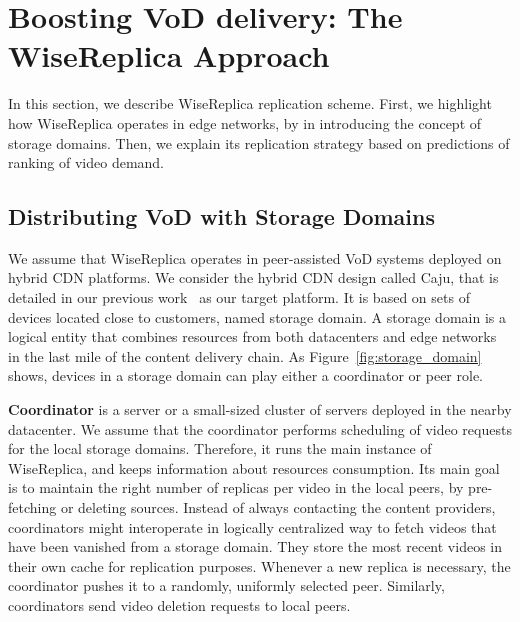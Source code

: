 \section{Boosting VoD delivery: The WiseReplica Approach}
\label{sec:replication_scheme}

In this section, we describe WiseReplica replication scheme. First, we highlight how WiseReplica operates in edge networks, by in introducing the concept of storage domains. Then, we explain its replication strategy based on predictions of ranking of video demand.

\subsection{Distributing VoD with Storage Domains}
\label{subsec:replication_scheme_sd}


We assume that WiseReplica operates in peer-assisted VoD systems deployed on hybrid CDN platforms. We consider the hybrid CDN design called Caju, that is detailed in our previous work~\cite{caju_tr_2012} as our target platform. It is based on sets of devices located close to customers, named storage domain. A storage domain is a logical
entity that combines resources from both datacenters and edge networks in the last mile of the content delivery chain. As Figure~\ref{fig:storage_domain} shows, devices in a storage domain can play either a coordinator or peer role. 

\noindent
\textbf{Coordinator} is a server or a small-sized cluster of servers deployed in the nearby datacenter. We assume that the coordinator performs scheduling of video requests for the local storage domains. Therefore, it runs the main instance of WiseReplica, and keeps information about resources consumption. Its main goal is to maintain the right number of replicas per video in the local peers, by pre-fetching or deleting sources. Instead of always contacting the content providers, coordinators might interoperate in logically centralized way to fetch videos that have been vanished from a storage domain. They store the most recent videos in their own cache for replication purposes. Whenever a new replica is necessary, the coordinator pushes it to a randomly, uniformly selected peer. Similarly, coordinators send video deletion requests to local peers. 

